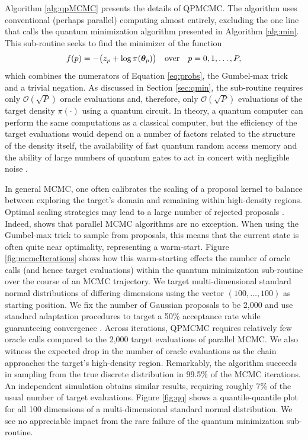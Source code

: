 \documentclass[12pt]{article} %
\begin{document}
Algorithm \ref{alg:qpMCMC} presents the details of QPMCMC.  The algorithm uses conventional (perhaps parallel) computing almost entirely, excluding the one line that calls the quantum minimization algorithm presented in Algorithm \ref{alg:min}. 
This sub-routine seeks to find the minimizer of the function
\begin{align*}
f(p)= -\big(z_{p}+ \log\pi(\boldsymbol{\theta}_{p}) \big) \quad \mbox{over} \quad p=0,1,\dots, P,
\end{align*} 
which combines the numerators of Equation \eqref{eq:probs}, the Gumbel-max trick and a trivial negation.  As discussed in Section \ref{sec:qmin}, the sub-routine requires only $\mathcal{O}(\sqrt{P})$ oracle evaluations and, therefore, only $\mathcal{O}(\sqrt{P})$ evaluations of the target density $\pi(\cdot)$ using a quantum circuit.  In theory, a quantum computer can perform the same computations as a classical computer, but the efficiency of the target evaluations would depend on a number of factors related to the structure of the density itself, the availability of fast quantum random access memory \citep{giovannetti2008quantum} and the ability of large numbers of quantum gates to act in concert with negligible noise \citep{kielpinski2002architecture,erhard2019characterizing}.



In general MCMC, one often calibrates the scaling of a proposal kernel to balance between exploring the target's domain and remaining within high-density regions.  Optimal scaling strategies may lead to a large number of rejected proposals \citep{roberts2001optimal}.  Indeed, \citet{holbrook2021generating} shows that parallel MCMC algorithms are no exception. When using the Gumbel-max trick to sample from proposals, this means that the current state is often quite near optimality, representing a warm-start.  Figure \ref{fig:mcmcIterations} shows how this warm-starting effects the number of oracle calls (and hence target evaluations) within the quantum minimization sub-routine over the course of an MCMC trajectory.  We target multi-dimensional standard normal distributions of differing dimensions using the vector $(100,\dots,100)$ as starting position. We fix the number of Gaussian proposals to be 2,000 and use standard adaptation procedures to target a 50\% acceptance rate while guaranteeing convergence \citep{rosenthal2011optimal}. Across iterations, QPMCMC requires relatively few oracle calls compared to the 2,000 target evaluations of parallel MCMC. We also witness the expected drop in the number of oracle evaluations as the chain approaches the target's high-density region. Remarkably, the algorithm succeeds in sampling from the true discrete distribution in 99.5\% of the MCMC iterations. An independent simulation obtains similar results, requiring roughly 7\% of the usual number of target evaluations. Figure \ref{fig:qq} shows a quantile-quantile plot for all 100 dimensions of a multi-dimensional standard normal distribution. We see no appreciable impact from the rare failure of the quantum minimization sub-routine.
\end{document}
